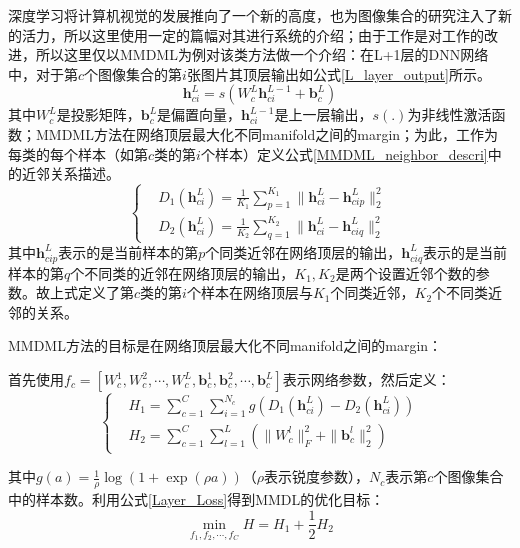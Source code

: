 深度学习将计算机视觉的发展推向了一个新的高度，也为图像集合的研究注入了新的活力，所以这里使用一定的篇幅对其进行系统的介绍；由于工作\cite{Deeplearning_MMDML}是对工作\cite{Deeplearning_DRM}的改进，所以这里仅以MMDML\cite{Deeplearning_MMDML}为例对该类方法做一个介绍：在L+1层的DNN网络中，对于第$c$个图像集合的第$i$张图片其顶层输出如公式\ref{L_layer_output}所示。
\begin{equation}
\label{L_layer_output}
\bm{h}_{ci}^{L}=s(W_{c}^{L}\bm{h}_{ci}^{L-1}+\bm{b}_{c}^{L})
\end{equation}
其中$W_c^L$是投影矩阵，$\bm{b}_c^L$是偏置向量，$\bm{h}_{ci}^{L-1}$是上一层输出，$s(.)$为非线性激活函数；MMDML\cite{Deeplearning_MMDML}方法在网络顶层最大化不同manifold之间的margin；为此，工作\cite{Deeplearning_MMDML}为每类的每个样本（如第$c$类的第$i$个样本）定义公式\ref{MMDML_neighbor_descri}中的近邻关系描述。
\begin{equation}
\label{MMDML_neighbor_descri}
\left\{
\begin{split}
&D_1 (\bm{h}_{ci}^L )=\frac{1}{K_1}\sum_{p=1}^{K_1}\|\bm{h}_{ci}^{L}-\bm{h}_{cip}^L\|_2^2\\
&D_2 (\bm{h}_{ci}^L )=\frac{1}{K_2}\sum_{q=1}^{K_2}\|\bm{h}_{ci}^L-\bm{h}_{ciq}^L\|_2^2 
\end{split}
\right.
\end{equation}
其中$\bm{h}_{cip}^L$表示的是当前样本的第$p$个同类近邻在网络顶层的输出，$\bm{h}_{ciq}^L$表示的是当前样本的第$q$个不同类的近邻在网络顶层的输出，$K_1,K_2$是两个设置近邻个数的参数。故上式定义了第$c$类的第$i$个样本在网络顶层与$K_1$个同类近邻，$K_2$个不同类近邻的关系。

MMDML方法的目标是在网络顶层最大化不同manifold之间的margin：

首先使用$f_c=[W_c^1,W_c^2,\cdots,W_c^L,\bm{b}_c^1,\bm{b}_c^2,\cdots,\bm{b}_c^L]$表示网络参数，然后定义：
\begin{equation}
\label{Layer_Loss}
\left\{
\begin{split}
&H_1=\sum_{c=1}^C\sum_{i=1}^{N_c}g(D_1(\bm{h}_{ci}^{L})-D_2(\bm{h}_{ci}^L))\\
&H_2=\sum_{c=1}^C\sum_{l=1}^L(\|W_{c}^{l}\|_{F}^{2}+\|\bm{b}_{c}^{l}\|_{2}^2)
\end{split}
\right.
\end{equation}

其中$g(a)=\frac{1}{\rho}\log(1+\exp(\rho a))$（$\rho$表示锐度参数），$N_c$表示第$c$个图像集合中的样本数。利用公式\ref{Layer_Loss}得到MMDL的优化目标：
\begin{displaymath}
\min_{f_1,f_2,\cdots,f_C }H= H_1+\frac{1}{2}H_2
\end{displaymath}

